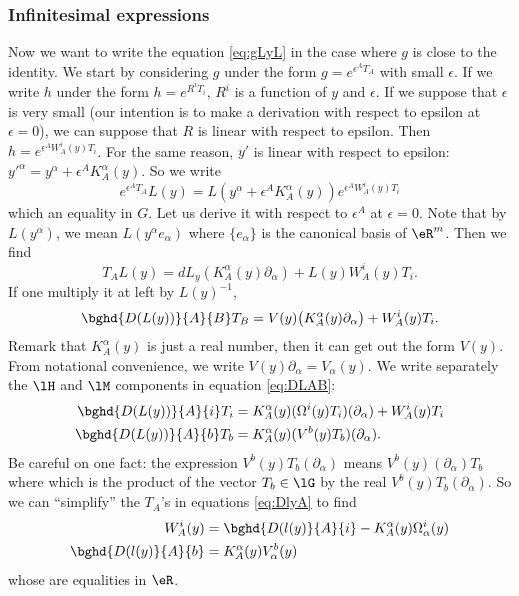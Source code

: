 \subsubsection{Infinitesimal expressions}

Now we want to write the equation \eqref{eq:gLyL} in the case where $g$ is close to the identity. We start by considering $g$ under the form $g=e^{\epsilon^AT_A}$ with small $\epsilon$. If we write $h$ under the form $h=e^{R^iT_i}$, $R^i$ is a function of $y$ and $\epsilon$. If we suppose that $\epsilon$ is very small (our intention is to make a derivation with respect to epsilon at $\epsilon=0$), we can suppose that $R$ is linear with respect to epsilon. Then $h=e^{\epsilon^AW_A^i(y)T_i}$. For the same reason, $y'$ is linear with respect to epsilon: ${y'}^{\alpha}=y^{\alpha}+\epsilon^AK_A^{\alpha}(y)$. So we write
\[
   e^{\epsilon^AT_A}L(y)=L(  y^{\alpha}+\epsilon^AK_A^{\alpha}(y)  )e^{\epsilon^AW_A^i(y)T_i}
\]
which an equality in $G$. Let us derive it with respect to $\epsilon^A$ at $\epsilon=0$. Note that by $L(y^{\alpha})$, we mean $L(y^{\alpha} e_{\alpha})$ where $\{e_{\alpha}\}$ is the canonical basis of $\eR^m$. Then we find
\[
   T_AL(y)=dL_y (  K^{\alpha}_A(y)\partial_{\alpha})+L(y)W_A^i(y)T_i.
\]
If one multiply it at left by $L(y)^{-1}$,
\begin{equation}\label{eq:DLAB}
    \bghd{D(L(y))}{A}{B}T_B=V(y)\big(  K_A^{\alpha}(y)\partial_{\alpha}  \big)+W_A^i(y)T_i.
\end{equation}
Remark that $K_A^{\alpha}(y)$ is just a real number, then it can get out the form $V(y)$. From notational convenience, we write $V(y)\partial_{\alpha}=V_{\alpha}(y)$. We write separately the $\lH$ and $\lM$ components in equation \eqref{eq:DLAB}:
\begin{subequations}\label{eq:DlyA}
\begin{align}
 \bghd{D(L(y))}{A}{i}T_i&=K_A^{\alpha}(y)(\Omega^i(y)T_i)(\partial_{\alpha})+W_A^i(y)T_i \\
 \bghd{D(L(y))}{A}{b}T_b&=K_A^{\alpha}(y)(V^b(y)T_b)(\partial_{\alpha}).
\end{align}
\end{subequations}
Be careful on one fact: the expression $V^b(y)T_b(\partial_{\alpha})$ means $V^b(y)(\partial_{\alpha})T_b$ where which is the product of the vector $T_b\in\lG$ by the real $V^b(y)T_b(\partial_{\alpha})$. So we can ``simplify''{} the $T_A$'s in equations \eqref{eq:DlyA} to find
\begin{subequations}
\begin{align}
  W_A^i(y)            &= \bghd{D(l(y)}{A}{i}-K_A^{\alpha}(y)\Omega^i_{\alpha}(y)\\
  \bghd{D(l(y)}{A}{b} &= K_A^{\alpha}(y)V_{\alpha}^b(y)
\end{align}
\end{subequations}
whose are equalities in $\eR$.


